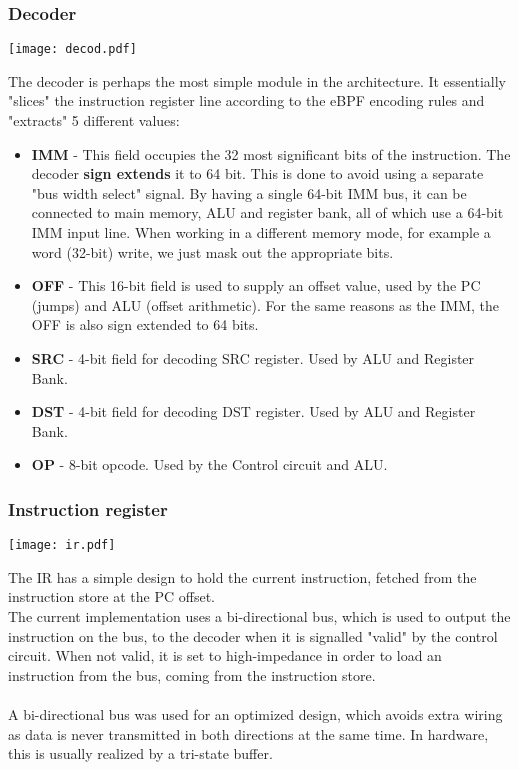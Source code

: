 \documentclass{l4proj}
\begin{document}
\subsubsection{Decoder}
\begin{center}
\texttt{[image: decod.pdf]}\\
\end{center}
The decoder is perhaps the most simple module in the architecture. It essentially "slices" the instruction register line according to the eBPF encoding rules and "extracts" 5 different values:
\begin{itemize}
    \item \textbf{IMM} - This field occupies the 32 most significant bits of the instruction. The decoder \textbf{sign extends} it to 64 bit. This is done to avoid using a separate "bus width select" signal. By having a single 64-bit IMM bus, it can be connected to main memory, ALU and register bank, all of which use a 64-bit IMM input line. When working in a different memory mode, for example a word (32-bit) write, we just mask out the appropriate bits.
    \item \textbf{OFF} - This 16-bit field is used to supply an offset value, used by the PC (jumps) and ALU (offset arithmetic). For the same reasons as the IMM, the OFF is also sign extended to 64 bits.
    \item \textbf{SRC} - 4-bit field for decoding SRC register. Used by ALU and Register Bank.
    \item \textbf{DST} - 4-bit field for decoding DST register. Used by ALU and Register Bank.
    \item \textbf{OP} - 8-bit opcode. Used by the Control circuit and ALU.
\end{itemize}

\subsubsection{Instruction register}
\begin{center}
\texttt{[image: ir.pdf]}\\
\end{center}
The IR has a simple design to hold the current instruction, fetched from the instruction store at the PC offset.\\
The current implementation uses a bi-directional bus, which is used to output the instruction on the bus, to the decoder when it is signalled "valid" by the control circuit. When not valid, it is set to high-impedance in order to load an instruction from the bus, coming from the instruction store.\\\\
A bi-directional bus was used for an optimized design, which avoids extra wiring as data is never transmitted in both directions at the same time. In hardware, this is usually realized by a tri-state buffer.
\end{document}
